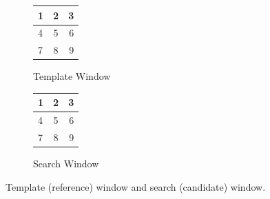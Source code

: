 \begin{figure}
\begin{center}
	\begin{subfigure}{0.3\textwidth}
		\begin{tabular}{|l|c|r|}
			\hline
			1 & 2 & 3 \\\hline
	  		4 & 5 & 6 \\\hline
	    	7 & 8 & 9 \\
	    	\hline
		\end{tabular}
		\caption{Template Window}
		\label{fig:template}
	\end{subfigure}
	\begin{subfigure}{0.3\textwidth}
		\begin{tabular}{|l|c|r|}
			\hline
			1 & 2 & 3 \\\hline
	  		4 & 5 & 6 \\\hline
	    	7 & 8 & 9 \\
	    	\hline
		\end{tabular}
		\caption{Search Window}
		\label{fig:search}
	\end{subfigure}
	\captionfonts
	\caption{Template (reference) window and search (candidate) window.}
	\label{fig:windows}
\end{center}
\end{figure}
















